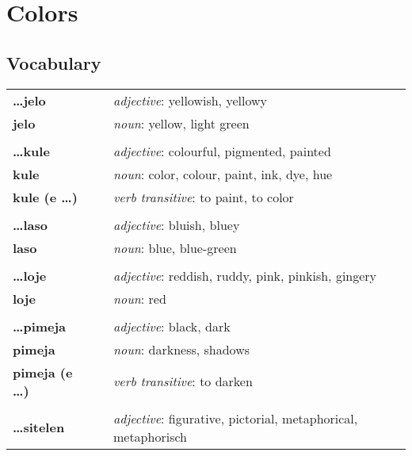 \section{Colors}
%
\subsection*{Vocabulary}
%
\begin{supertabular}{p{2,5cm}|ll}
%
\textbf{\dots jelo} && \textit{adjective}: yellowish, yellowy \\ %
\textbf{jelo} && \textit{noun}: yellow, light green \\ %
 && \\ %
%
\textbf{\dots kule} && \textit{adjective}: colourful, pigmented, painted \\ %
\textbf{kule} && \textit{noun}: color, colour, paint, ink, dye, hue \\ %
\textbf{kule (e \dots)} && \textit{verb transitive}: to paint, to color \\ %
 && \\ %
%
\textbf{\dots laso} && \textit{adjective}: bluish, bluey \\ %
\textbf{laso} && \textit{noun}: blue, blue-green \\ %
 && \\ %
%
\textbf{\dots loje} && \textit{adjective}: reddish, ruddy, pink, pinkish, gingery \\ %
\textbf{loje} && \textit{noun}: red \\ %
 && \\ %
%
\textbf{\dots pimeja} && \textit{adjective}: black, dark \\ %
\textbf{pimeja} && \textit{noun}: darkness, shadows \\ %
\textbf{pimeja (e \dots)} && \textit{verb transitive}: to darken \\ %
 && \\ %
%
\textbf{\dots sitelen} && \textit{adjective}: figurative, pictorial, metaphorical, metaphorisch \\ %

\end{supertabular}
